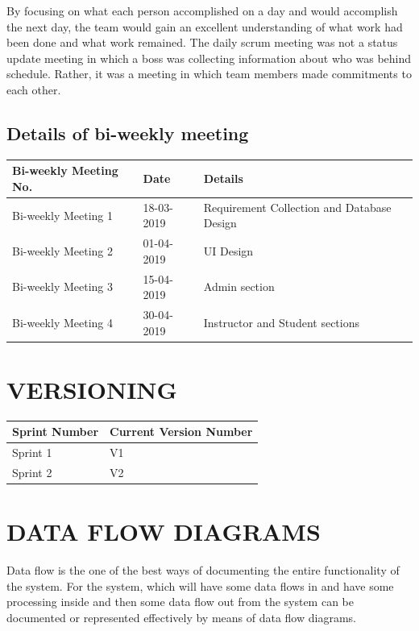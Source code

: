 By focusing on what each person accomplished on a day and would accomplish the next day, the team would gain an excellent understanding of what work had been done and what work remained. The daily scrum meeting was not a status update meeting in which a boss was collecting information about who was behind schedule. Rather, it was a  meeting in which team members made commitments to each other.
%
\section{Details of bi-weekly meeting}
%
%
\renewcommand{\arraystretch}{1.25}
\begin{center}
\begin{tabular}{|p{2cm}|p{2.5cm}|p{8cm}|}
\hline
{\bf Bi-weekly Meeting No.} & {\bf Date} & {\bf Details} \\
\hline
Bi-weekly Meeting 1 & 18-03-2019 & Requirement Collection and Database Design \\
\hline
Bi-weekly Meeting 2 & 01-04-2019 & UI Design  \\
\hline
Bi-weekly Meeting 3 & 15-04-2019 & Admin section \\
\hline
Bi-weekly Meeting 4 & 30-04-2019 & Instructor and Student sections \\
\hline
\end{tabular}
\end{center}
\renewcommand{\arraystretch}{1}
%
%
%
%
\chapter{VERSIONING}
%
%
\renewcommand{\arraystretch}{1.25}
\begin{center}
\begin{tabular}{|p{3cm}|p{5cm}|}
\hline
{\bf Sprint Number} & {\bf Current Version Number}\\
\hline
Sprint 1 & V1 \\
\hline
Sprint 2 & V2 \\  
\hline
\end{tabular}
\end{center}
\renewcommand{\arraystretch}{1}
%
%
\chapter{DATA FLOW DIAGRAMS}
Data flow is the one of the best ways of documenting the entire functionality of the system. For the system, which will have some data flows in and have some processing inside and then some data flow out from the system can be documented or represented effectively by means of data flow diagrams. 

